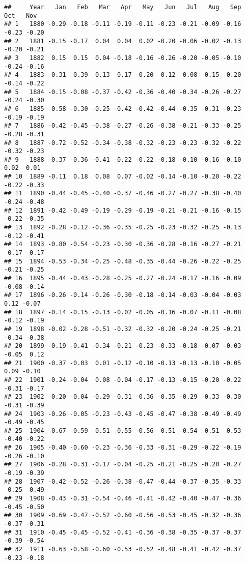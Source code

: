 \documentclass[]{article}
\begin{document}
\begin{verbatim}
##     Year   Jan   Feb   Mar   Apr   May   Jun   Jul   Aug   Sep   Oct   Nov
## 1   1880 -0.29 -0.18 -0.11 -0.19 -0.11 -0.23 -0.21 -0.09 -0.16 -0.23 -0.20
## 2   1881 -0.15 -0.17  0.04  0.04  0.02 -0.20 -0.06 -0.02 -0.13 -0.20 -0.21
## 3   1882  0.15  0.15  0.04 -0.18 -0.16 -0.26 -0.20 -0.05 -0.10 -0.24 -0.16
## 4   1883 -0.31 -0.39 -0.13 -0.17 -0.20 -0.12 -0.08 -0.15 -0.20 -0.14 -0.22
## 5   1884 -0.15 -0.08 -0.37 -0.42 -0.36 -0.40 -0.34 -0.26 -0.27 -0.24 -0.30
## 6   1885 -0.58 -0.30 -0.25 -0.42 -0.42 -0.44 -0.35 -0.31 -0.23 -0.19 -0.19
## 7   1886 -0.42 -0.45 -0.38 -0.27 -0.26 -0.38 -0.21 -0.33 -0.25 -0.28 -0.31
## 8   1887 -0.72 -0.52 -0.34 -0.38 -0.32 -0.23 -0.23 -0.32 -0.22 -0.32 -0.23
## 9   1888 -0.37 -0.36 -0.41 -0.22 -0.22 -0.18 -0.10 -0.16 -0.10  0.02  0.01
## 10  1889 -0.11  0.18  0.08  0.07 -0.02 -0.14 -0.10 -0.20 -0.22 -0.22 -0.33
## 11  1890 -0.44 -0.45 -0.40 -0.37 -0.46 -0.27 -0.27 -0.38 -0.40 -0.24 -0.48
## 12  1891 -0.42 -0.49 -0.19 -0.29 -0.19 -0.21 -0.21 -0.16 -0.15 -0.22 -0.35
## 13  1892 -0.28 -0.12 -0.36 -0.35 -0.25 -0.23 -0.32 -0.25 -0.13 -0.12 -0.41
## 14  1893 -0.80 -0.54 -0.23 -0.30 -0.36 -0.28 -0.16 -0.27 -0.21 -0.17 -0.17
## 15  1894 -0.53 -0.34 -0.25 -0.48 -0.35 -0.44 -0.26 -0.22 -0.25 -0.21 -0.25
## 16  1895 -0.44 -0.43 -0.28 -0.25 -0.27 -0.24 -0.17 -0.16 -0.09 -0.08 -0.14
## 17  1896 -0.26 -0.14 -0.26 -0.30 -0.18 -0.14 -0.03 -0.04 -0.03  0.12 -0.07
## 18  1897 -0.14 -0.15 -0.13 -0.02 -0.05 -0.16 -0.07 -0.11 -0.08 -0.12 -0.19
## 19  1898 -0.02 -0.28 -0.51 -0.32 -0.32 -0.20 -0.24 -0.25 -0.21 -0.34 -0.38
## 20  1899 -0.19 -0.41 -0.34 -0.21 -0.23 -0.33 -0.18 -0.07 -0.03 -0.05  0.12
## 21  1900 -0.37 -0.03  0.01 -0.12 -0.10 -0.13 -0.13 -0.10 -0.05  0.09 -0.10
## 22  1901 -0.24 -0.04  0.08 -0.04 -0.17 -0.13 -0.15 -0.20 -0.22 -0.31 -0.17
## 23  1902 -0.20 -0.04 -0.29 -0.31 -0.36 -0.35 -0.29 -0.33 -0.30 -0.31 -0.39
## 24  1903 -0.26 -0.05 -0.23 -0.43 -0.45 -0.47 -0.38 -0.49 -0.49 -0.49 -0.45
## 25  1904 -0.67 -0.59 -0.51 -0.55 -0.56 -0.51 -0.54 -0.51 -0.53 -0.40 -0.22
## 26  1905 -0.40 -0.60 -0.23 -0.36 -0.33 -0.31 -0.29 -0.22 -0.19 -0.26 -0.10
## 27  1906 -0.28 -0.31 -0.17 -0.04 -0.25 -0.21 -0.25 -0.20 -0.27 -0.19 -0.39
## 28  1907 -0.42 -0.52 -0.26 -0.38 -0.47 -0.44 -0.37 -0.35 -0.33 -0.25 -0.49
## 29  1908 -0.43 -0.31 -0.54 -0.46 -0.41 -0.42 -0.40 -0.47 -0.36 -0.45 -0.50
## 30  1909 -0.69 -0.47 -0.52 -0.60 -0.56 -0.53 -0.45 -0.32 -0.36 -0.37 -0.31
## 31  1910 -0.45 -0.45 -0.52 -0.41 -0.36 -0.38 -0.35 -0.37 -0.37 -0.39 -0.54
## 32  1911 -0.63 -0.58 -0.60 -0.53 -0.52 -0.48 -0.41 -0.42 -0.37 -0.23 -0.18

\end{verbatim}
\end{document}
